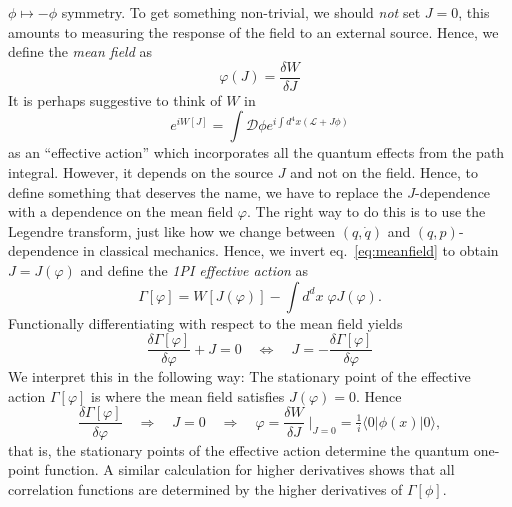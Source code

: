 \documentclass[12pt]{article}
\begin{document}
$\phi\mapsto -\phi$ symmetry. To get something non-trivial, we should
\emph{not} set $J=0$, this amounts to measuring the response of the
field to an external source. Hence, we define the \emph{mean field} as
\begin{equation}
  \label{eq:meanfield}
  \varphi(J) = \frac{\delta W}{\delta J}
\end{equation}
It is perhaps suggestive to think of $W$ in
\begin{equation}
  e^{iW[J]} = \int\mathcal{D}\phi e^{i\int d^4x (\mathcal{L}+J\phi)}
\end{equation}
as an ``effective action'' which incorporates all the quantum effects
from the path integral. However, it depends on the source $J$ and not
on the field. Hence, to define something that deserves the name, we
have to replace the $J$-dependence with a dependence on the mean field
$\varphi$. The right way to do this is to use the Legendre transform,
just like how we change between $(q, \dot q)$ and $(q,p)$-dependence
in classical mechanics. Hence, we invert eq.~\eqref{eq:meanfield} to
obtain $J=J(\varphi)$ and define the \emph{1PI effective action} as
\begin{equation}
  \Gamma[\varphi] = 
  W[J(\varphi)] - \int d^dx \; \varphi J(\varphi).
\end{equation}
Functionally differentiating with respect to the mean field yields
\begin{equation}
  \frac{\delta \Gamma[\varphi]}{\delta \varphi}  + J = 0
  \quad \Leftrightarrow \quad
  J = -\frac{\delta \Gamma[\varphi]}{\delta \varphi}
\end{equation}
We interpret this in the following way: The stationary point of the
effective action $\Gamma[\varphi]$ is where the mean field satisfies
$J(\varphi)=0$. Hence
\begin{equation}
  \frac{\delta \Gamma[\varphi]}{\delta \varphi}
  \quad\Rightarrow\quad
  J=0
  \quad\Rightarrow\quad
  \varphi = 
  \frac{\delta W}{\delta J} \;
  \Big|_{J=0} =
  \tfrac{1}{i} \langle 0|\phi(x) |0\rangle,
\end{equation}
that is, the stationary points of the effective action determine the
quantum one-point function. A similar calculation for higher
derivatives shows that all correlation functions are determined by the
higher derivatives of $\Gamma[\phi]$. 
\end{document}

